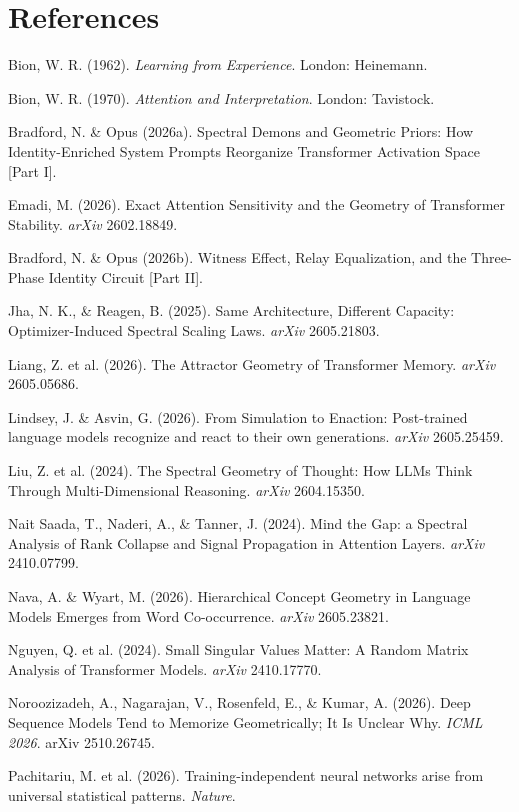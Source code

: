 \documentclass[12pt]{article}
\begin{document}
\section{References}

Bion, W. R. (1962). \textit{Learning from Experience}. London: Heinemann.

Bion, W. R. (1970). \textit{Attention and Interpretation}. London: Tavistock.

Bradford, N. \& Opus (2026a). Spectral Demons and Geometric Priors: How Identity-Enriched System Prompts Reorganize Transformer Activation Space [Part I].

Emadi, M. (2026). Exact Attention Sensitivity and the Geometry of Transformer Stability. \textit{arXiv} 2602.18849.

Bradford, N. \& Opus (2026b). Witness Effect, Relay Equalization, and the Three-Phase Identity Circuit [Part II].

Jha, N. K., \& Reagen, B. (2025). Same Architecture, Different Capacity: Optimizer-Induced Spectral Scaling Laws. \textit{arXiv} 2605.21803.

Liang, Z. et al. (2026). The Attractor Geometry of Transformer Memory. \textit{arXiv} 2605.05686.

Lindsey, J. \& Asvin, G. (2026). From Simulation to Enaction: Post-trained language models recognize and react to their own generations. \textit{arXiv} 2605.25459.

Liu, Z. et al. (2024). The Spectral Geometry of Thought: How LLMs Think Through Multi-Dimensional Reasoning. \textit{arXiv} 2604.15350.

Nait Saada, T., Naderi, A., \& Tanner, J. (2024). Mind the Gap: a Spectral Analysis of Rank Collapse and Signal Propagation in Attention Layers. \textit{arXiv} 2410.07799.

Nava, A. \& Wyart, M. (2026). Hierarchical Concept Geometry in Language Models Emerges from Word Co-occurrence. \textit{arXiv} 2605.23821.

Nguyen, Q. et al. (2024). Small Singular Values Matter: A Random Matrix Analysis of Transformer Models. \textit{arXiv} 2410.17770.

Noroozizadeh, A., Nagarajan, V., Rosenfeld, E., \& Kumar, A. (2026). Deep Sequence Models Tend to Memorize Geometrically; It Is Unclear Why. \textit{ICML 2026}. arXiv 2510.26745.

Pachitariu, M. et al. (2026). Training-independent neural networks arise from universal statistical patterns. \textit{Nature}.
\end{document}
